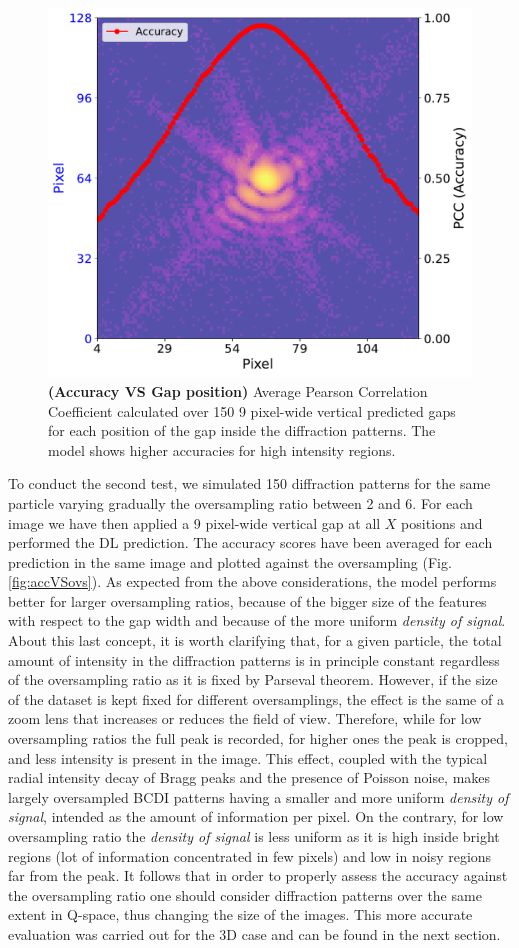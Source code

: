 \begin{figure}[h]
    \centering
    \includegraphics[width=.7\textwidth]{figures/Inpainting/2D_acc_pos.pdf}
    \caption{\textbf{(Accuracy VS Gap position)} Average Pearson Correlation Coefficient calculated over 150 
    9 pixel-wide vertical predicted gaps for each position of the gap inside the diffraction patterns. The model 
    shows higher accuracies for high intensity regions.}
    \label{fig:accVSpos}
\end{figure}

To conduct the second test, we simulated 150 diffraction patterns for the same particle varying gradually the oversampling
ratio between 2 and 6. For each image we have then applied a 9 pixel-wide vertical gap at all $X$ positions and performed 
the DL prediction. The accuracy scores have been averaged for each prediction in the same image and plotted against the oversampling 
(Fig. \ref{fig:accVSovs}). As expected from the above considerations, the model performs better for larger oversampling ratios, 
because of the bigger size of the features with respect to the gap width and because of the more uniform \textit{density of signal}.
About this last concept, it is worth clarifying that, for a given particle, the total amount of intensity in the
diffraction patterns is in principle constant regardless of the oversampling ratio as it is fixed by Parseval theorem.
However, if the size of the dataset is kept fixed for different oversamplings, the effect is the same of a zoom lens
that increases or reduces the field of view. Therefore, while for low oversampling ratios the full peak is recorded, 
for higher ones the peak is cropped, and less intensity is present in the image. This effect, coupled with the typical radial
intensity decay of Bragg peaks and the presence of Poisson noise, makes largely oversampled BCDI patterns having a smaller
and more uniform \textit{density of signal}, intended as the amount of information per pixel. On the contrary, for low 
oversampling ratio the \textit{density of signal} is less uniform as it is high inside bright regions (lot of information
concentrated in few pixels) and low in noisy regions far from the peak. It follows that in order to properly assess the accuracy
against the oversampling ratio one should consider diffraction patterns over the same extent in Q-space, thus changing 
the size of the images. This more accurate evaluation was carried out for the 3D case and can be found in the next section.

